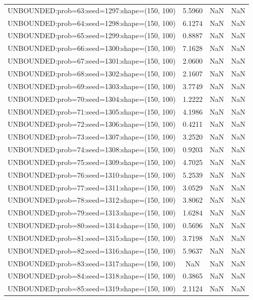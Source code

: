 \begin{longtable}{lccc}
UNBOUNDED:prob=63:seed=1297:shape=(150, 100)  &  5.5960 &   NaN &    NaN \\
UNBOUNDED:prob=64:seed=1298:shape=(150, 100)  &  6.1274 &   NaN &    NaN \\
UNBOUNDED:prob=65:seed=1299:shape=(150, 100)  &  0.8887 &   NaN &    NaN \\
UNBOUNDED:prob=66:seed=1300:shape=(150, 100)  &  7.1628 &   NaN &    NaN \\
UNBOUNDED:prob=67:seed=1301:shape=(150, 100)  &  2.0600 &   NaN &    NaN \\
UNBOUNDED:prob=68:seed=1302:shape=(150, 100)  &  2.1607 &   NaN &    NaN \\
UNBOUNDED:prob=69:seed=1303:shape=(150, 100)  &  3.7749 &   NaN &    NaN \\
UNBOUNDED:prob=70:seed=1304:shape=(150, 100)  &  1.2222 &   NaN &    NaN \\
UNBOUNDED:prob=71:seed=1305:shape=(150, 100)  &  4.1986 &   NaN &    NaN \\
UNBOUNDED:prob=72:seed=1306:shape=(150, 100)  &  0.4211 &   NaN &    NaN \\
UNBOUNDED:prob=73:seed=1307:shape=(150, 100)  &  3.2520 &   NaN &    NaN \\
UNBOUNDED:prob=74:seed=1308:shape=(150, 100)  &  0.9203 &   NaN &    NaN \\
UNBOUNDED:prob=75:seed=1309:shape=(150, 100)  &  4.7025 &   NaN &    NaN \\
UNBOUNDED:prob=76:seed=1310:shape=(150, 100)  &  5.2539 &   NaN &    NaN \\
UNBOUNDED:prob=77:seed=1311:shape=(150, 100)  &  3.0529 &   NaN &    NaN \\
UNBOUNDED:prob=78:seed=1312:shape=(150, 100)  &  3.8062 &   NaN &    NaN \\
UNBOUNDED:prob=79:seed=1313:shape=(150, 100)  &  1.6284 &   NaN &    NaN \\
UNBOUNDED:prob=80:seed=1314:shape=(150, 100)  &  0.5696 &   NaN &    NaN \\
UNBOUNDED:prob=81:seed=1315:shape=(150, 100)  &  3.7198 &   NaN &    NaN \\
UNBOUNDED:prob=82:seed=1316:shape=(150, 100)  &  5.9637 &   NaN &    NaN \\
UNBOUNDED:prob=83:seed=1317:shape=(150, 100)  &     NaN &   NaN &    NaN \\
UNBOUNDED:prob=84:seed=1318:shape=(150, 100)  &  0.3865 &   NaN &    NaN \\
UNBOUNDED:prob=85:seed=1319:shape=(150, 100)  &  2.1124 &   NaN &    NaN \\

\end{longtable}
